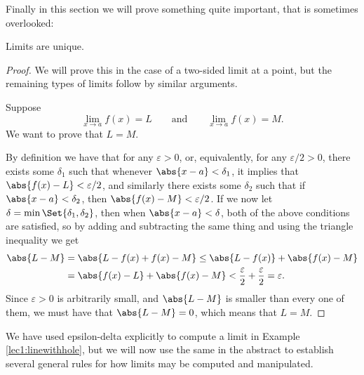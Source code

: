 \noindent
Finally in this section we will prove something quite important, that is sometimes overlooked:

\begin{theorem}
	Limits are unique.
\end{theorem}

\begin{proof}
	We will prove this in the case of a two-sided limit at a point, but the remaining types of limits follow by similar arguments.

	Suppose
	\[
		\lim_{x \to a} f(x) = L \qquad \text{and} \qquad \lim_{x \to a} f(x) = M.
	\]
	We want to prove that $L = M$.

	By definition we have that for any $\varepsilon > 0$, or, equivalently, for any $\varepsilon / 2 > 0$, there exists some $\delta_1$ such that whenever $\abs{x - a} < \delta_1$, it implies that $\abs{f(x) - L} < \varepsilon / 2$, and similarly there exists some $\delta_2$ such that if $\abs{x - a} < \delta_2$, then $\abs{f(x) - M} < \varepsilon / 2$. If we now let $\delta = \min\Set{\delta_1, \delta_2}$, then when $\abs{x - a} < \delta$, both of the above conditions are satisfied, so by adding and subtracting the same thing and using the triangle inequality we get
	\begin{align*}
		\abs{L - M} & = \abs{L - f(x) + f(x) - M} \leq \abs{L - f(x)} + \abs{f(x) - M}                                 \\
		            & = \abs{f(x) - L} + \abs{f(x) - M} < \frac{\varepsilon}{2} + \frac{\varepsilon}{2} = \varepsilon.
	\end{align*}
	Since $\varepsilon > 0$ is arbitrarily small, and $\abs{L - M}$ is smaller than every one of them, we must have that $\abs{L - M} = 0$, which means that $L = M$.
\end{proof}


We have used epsilon-delta explicitly to compute a limit in Example \ref{lec1:linewithhole}, but we will now use the same in the abstract to establish several general rules for how limits may be computed and manipulated.

